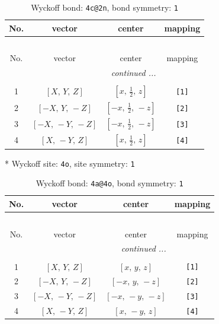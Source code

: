 \documentclass[fleqn,8pt]{jsarticle}
\begin{document}
\begin{longtable}{cccc}
\caption{Wyckoff bond: {\tt 4c@2n}, bond symmetry: {\tt 1}}
 \\
 \hline \hline
No. & vector & center & mapping \\ \hline \endfirsthead

\multicolumn{3}{l}{\tablename\ \thetable{}} \\
 \hline \hline
No. & vector & center & mapping \\ \hline \endhead

 \hline \hline
\multicolumn{3}{r}{\footnotesize\it continued ...} \\ \endfoot

 \hline \hline
\multicolumn{3}{r}{} \\ \endlastfoot

1 & $\left[ X,\, Y,\, Z \right]$ & $\left[ x,\, \frac{1}{2},\, z \right]$ & {\tt [1]} \\ \hline
2 & $\left[ - X,\, Y,\, - Z \right]$ & $\left[ - x,\, \frac{1}{2},\, - z \right]$ & {\tt [2]} \\ \hline
3 & $\left[ - X,\, - Y,\, - Z \right]$ & $\left[ - x,\, \frac{1}{2},\, - z \right]$ & {\tt [3]} \\ \hline
4 & $\left[ X,\, - Y,\, Z \right]$ & $\left[ x,\, \frac{1}{2},\, z \right]$ & {\tt [4]} \\
\end{longtable}
* Wyckoff site: {\tt 4o}, site symmetry: {\tt 1}
\renewcommand{\arraystretch}{1.2}
\begin{longtable}{cccc}
\caption{Wyckoff bond: {\tt 4a@4o}, bond symmetry: {\tt 1}}
 \\
 \hline \hline
No. & vector & center & mapping \\ \hline \endfirsthead

\multicolumn{3}{l}{\tablename\ \thetable{}} \\
 \hline \hline
No. & vector & center & mapping \\ \hline \endhead

 \hline \hline
\multicolumn{3}{r}{\footnotesize\it continued ...} \\ \endfoot

 \hline \hline
\multicolumn{3}{r}{} \\ \endlastfoot

1 & $\left[ X,\, Y,\, Z \right]$ & $\left[ x,\, y,\, z \right]$ & {\tt [1]} \\ \hline
2 & $\left[ - X,\, Y,\, - Z \right]$ & $\left[ - x,\, y,\, - z \right]$ & {\tt [2]} \\ \hline
3 & $\left[ - X,\, - Y,\, - Z \right]$ & $\left[ - x,\, - y,\, - z \right]$ & {\tt [3]} \\ \hline
4 & $\left[ X,\, - Y,\, Z \right]$ & $\left[ x,\, - y,\, z \right]$ & {\tt [4]} \\
\end{longtable}
\end{document}

